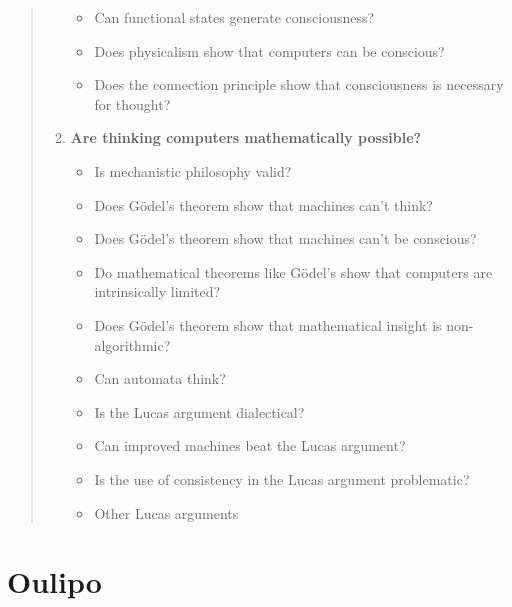 \begin{quotation}
\begin{enumerate}
\begin{itemize}
        \item Can functional states generate consciousness?
        \item Does physicalism show that computers can be conscious?
        \item Does the connection principle show that consciousness is necessary for thought?
      \end{itemize}
    \item \textbf{Are thinking computers mathematically possible?}
      \begin{itemize}
        \item Is mechanistic philosophy valid?
        \item Does G{\"o}del's theorem show that machines can't think?
        \item Does G{\"o}del's theorem show that machines can't be conscious?
        \item Do mathematical theorems like G{\"o}del's show that computers are intrinsically limited?
        \item Does G{\"o}del's theorem show that mathematical insight is non-algorithmic?
        \item Can automata think?
        \item Is the Lucas argument dialectical?
        \item Can improved machines beat the Lucas argument?
        \item Is the use of consistency in the Lucas argument problematic?
        \item Other Lucas arguments
      \end{itemize}
  \end{enumerate}
\end{quotation}


\section{Oulipo}
\label{s:appoulipo}

